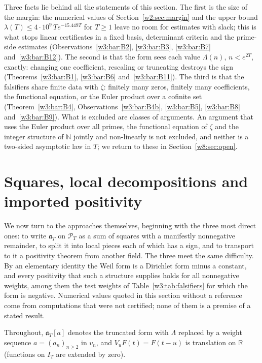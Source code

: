 \documentclass[11pt]{amsart}
\theoremstyle{definition}
\theoremstyle{remark}
\numberwithin{equation}{section}
\newcommand{\R}{\mathbb{R}}
\newcommand{\N}{\mathbb{N}}
\newcommand{\IT}{I_T}                                  %
\newcommand{\PT}{\mathcal{P}_T}                        %
\newcommand{\aT}{\mathfrak{a}_T}                       %
\newcommand{\lam}{\lambda(T)}                          %
\begin{document}
Three facts lie behind all the statements of this section. The first is the size of the margin: the numerical
values of Section~\ref{w2:sec:margin} and the upper bound $\lam\le4\cdot10^9\,Te^{-15.449T}$ for $T\ge1$
\cite[Corollary~9.11]{P46} leave no room for estimates with slack; this is what stops linear certificates in a fixed
basis, determinant criteria and the prime-side estimates (Observations~\ref{w3:bar:B2}, \ref{w3:bar:B3},
\ref{w3:bar:B7} and~\ref{w3:bar:B12}). The second is that the form sees each value $\Lambda(n)$, $n<e^{2T}$,
exactly: changing one coefficient, rescaling or truncating destroys the sign (Theorems~\ref{w3:bar:B1},
\ref{w3:bar:B6} and~\ref{w3:bar:B11}). The third is that the falsifiers share finite data with $\zeta$: finitely
many zeros, finitely many coefficients, the functional equation, or the Euler product over a cofinite set
(Theorem~\ref{w3:bar:B4}, Observations~\ref{w3:bar:B4b}, \ref{w3:bar:B5}, \ref{w3:bar:B8} and~\ref{w3:bar:B9}).
What is excluded are classes of arguments. An argument that uses the Euler product over all primes, the functional
equation of $\zeta$ and the integer structure of $\N$ jointly and non-linearly is not excluded, and neither is a
two-sided asymptotic law in $T$; we return to these in Section~\ref{w8:sec:open}.

\section{Squares, local decompositions and imported positivity}\label{w4:sec:squares}

We now turn to the approaches themselves, beginning with the three most direct ones: to write $\aT$ on $\PT$ as a sum of
squares with a manifestly nonnegative remainder, to split it into local pieces each of which has a sign, and to transport
to it a positivity theorem from another field. The three meet the same difficulty. By an elementary identity the Weil
form is a Dirichlet form minus a constant, and every positivity that such a structure supplies holds for all nonnegative
weights, among them the test weights of Table~\ref{w3:tab:falsifiers} for which the form is negative. Numerical values
quoted in this section without a reference come from computations that were not certified; none of them is a premise of a
stated result.

Throughout, $\aT[a]$ denotes the truncated form with $\Lambda$ replaced by a weight sequence $a=(a_n)_{n\ge2}$ in
$v_n$, and $V_uF(t)=F(t-u)$ is translation on $\R$ (functions on $\IT$ are extended by zero).
\end{document}
